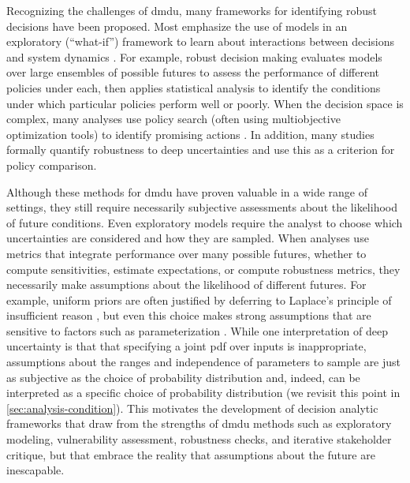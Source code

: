 \documentclass[11pt]{article}
\begin{document}
Recognizing the challenges of \gls{dmdu}, many frameworks for identifying robust decisions have been proposed.
Most emphasize the use of models in an exploratory (``what-if'') framework to learn about interactions between decisions and system dynamics \citep{bankes:1993}.
For example, robust decision making \citep{lempert_shaping:2003} evaluates models over large ensembles of possible futures to assess the performance of different policies under each, then applies statistical analysis to identify the conditions under which particular policies perform well or poorly.
When the decision space is complex, many analyses use policy search (often using multiobjective optimization tools) to identify promising actions \citep{kasprzyk:2013,kasprzyk_denovo:2012,hadka_mordm:2015}.
In addition, many studies formally quantify robustness to deep uncertainties \citep{herman:2015,mcphail_robustness:2019} and use this as a criterion for policy comparison.

Although these methods for \gls{dmdu} have proven valuable in a wide range of settings, they still require necessarily subjective assessments about the likelihood of future conditions.
Even exploratory models require the analyst to choose which uncertainties are considered and how they are sampled.
When analyses use metrics that integrate performance over many possible futures, whether to compute sensitivities, estimate expectations, or compute robustness metrics, they necessarily make assumptions about the likelihood of different futures.
For example, uniform priors are often justified by deferring to Laplace's principle of insufficient reason \citep[see][p.~135]{stigler_uncertainty:1986}, but even this choice makes strong assumptions that are sensitive to factors such as parameterization \citep[p.54]{gelman_bda3:2014}.
While one interpretation of deep uncertainty is that that specifying a joint \gls{pdf} over inputs is inappropriate, assumptions about the ranges and independence of parameters to sample are just as subjective as the choice of probability distribution \citep{schneider_scenarios:2002,quinn_exploratory:2020} and, indeed, can be interpreted  as a specific choice of probability distribution (we revisit this point in \cref{sec:analysis-condition}).
This motivates the development of decision analytic frameworks that draw from the strengths of \gls{dmdu} methods such as exploratory modeling, vulnerability assessment, robustness checks, and iterative stakeholder critique, but that embrace the reality that assumptions about the future are inescapable.
\end{document}
